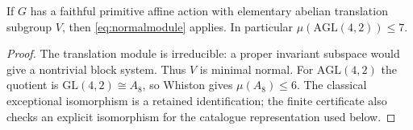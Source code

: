 \begin{corollary}\label{cor:affine}
If $G$ has a faithful primitive affine action with elementary abelian
translation subgroup $V$, then \eqref{eq:normalmodule} applies. In particular
$\mu(\mathrm{AGL}(4,2))\leq7$.
\end{corollary}
\begin{proof}
The translation module is irreducible: a proper invariant subspace
would give a nontrivial block system. Thus $V$ is minimal normal.
For $\mathrm{AGL}(4,2)$ the quotient is
$\mathrm{GL}(4,2)\cong A_8$, so Whiston gives $\mu(A_8)\leq6$.
The classical exceptional isomorphism is a retained identification;
the finite certificate also checks an explicit isomorphism for the
catalogue representation used below.
\end{proof}

